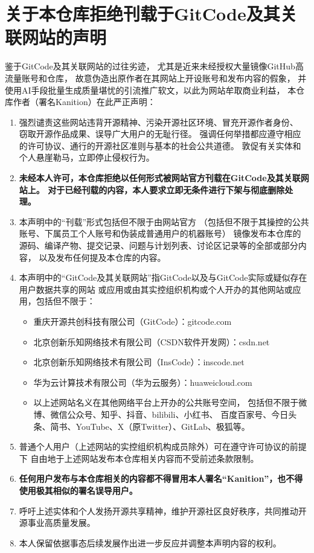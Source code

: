 \chapter[关于本仓库拒绝刊载于GitCode及其关联网站的声明]{{\LARGE 关于本仓库拒绝刊载于GitCode及其关联网站的声明}}
\label{chap:关于本仓库拒绝刊载于GitCode及其关联网站的声明}

鉴于GitCode及其关联网站的过往劣迹，
尤其是近来未经授权大量镜像GitHub高流量账号和仓库，
故意伪造出原作者在其网站上开设账号和发布内容的假象，
并使用AI手段批量生成质量堪忧的引流推广软文，以此为网站牟取商业利益，
本仓库作者（署名Kanition）在此严正声明：

\begin{enumerate}
      \item 强烈谴责这些网站违背开源精神、污染开源社区环境、冒充开源作者身份、
            窃取开源作品成果、误导广大用户的无耻行径。
            强调任何举措都应遵守相应的许可协议、通行的开源社区准则与基本的社会公共道德。
            敦促有关实体和个人悬崖勒马，立即停止侵权行为。
      \item {\bfseries 未经本人许可，本仓库拒绝以任何形式被网站官方刊载在GitCode及其关联网站上。
            对于已经刊载的内容，本人要求立即无条件进行下架与彻底删除处理。}
      \item 本声明中的“刊载”形式包括但不限于由网站官方
            （包括但不限于其操控的公共账号、下属员工个人账号和伪装成普通用户的机器账号）
            镜像发布本仓库的源码、编译产物、提交记录、问题与计划列表、讨论区记录等的全部或部分内容，
            以及发布任何提及本仓库的内容。
      \item 本声明中的“GitCode及其关联网站”指GitCode以及与GitCode实际或疑似存在用户数据共享的网站
            或应用或由其实控组织机构或个人开办的其他网站或应用，包括但不限于：
            \begin{itemize}
                  \item 重庆开源共创科技有限公司（GitCode）：gitcode.com
                  \item 北京创新乐知网络技术有限公司（CSDN软件开发网）：csdn.net
                  \item 北京创新乐知网络技术有限公司（InsCode）：inscode.net
                  \item 华为云计算技术有限公司（华为云服务）：huaweicloud.com
                  \item 以上述网站名义在其他网络平台上开办的公共账号空间，
                        包括但不限于微博、微信公众号、知乎、抖音、bilibili、小红书、
                        百度百家号、今日头条、简书、YouTube、X（原Twitter）、GitLab、极狐等。
            \end{itemize}
      \item 普通个人用户（上述网站的实控组织机构成员除外）可在遵守许可协议的前提下
            自由地于上述网站发布本仓库相关内容而不受前述条款限制。
      \item {\bfseries 任何用户发布与本仓库相关的内容都不得冒用本人署名“Kanition”，也不得使用极其相似的署名误导用户。}
      \item 呼吁上述实体和个人发扬开源共享精神，维护开源社区良好秩序，共同推动开源事业高质量发展。
      \item 本人保留依据事态后续发展作出进一步反应并调整本声明内容的权利。
\end{enumerate}
